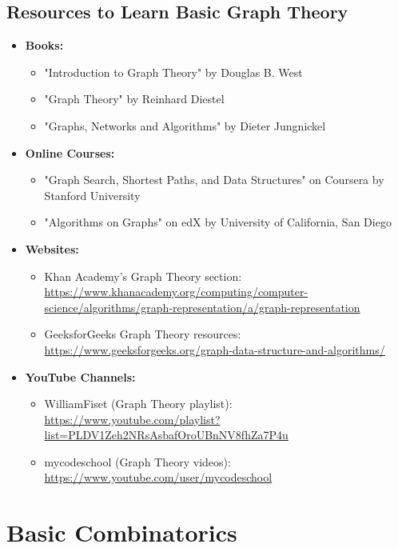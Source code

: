 \documentclass[openany]{book}
\begin{document}
\subsection{Resources to Learn Basic Graph Theory}
\begin{itemize}
    \item \textbf{Books:}
    \begin{itemize}
        \item "Introduction to Graph Theory" by Douglas B. West
        \item "Graph Theory" by Reinhard Diestel
        \item "Graphs, Networks and Algorithms" by Dieter Jungnickel
    \end{itemize}
    \item \textbf{Online Courses:}
    \begin{itemize}
        \item "Graph Search, Shortest Paths, and Data Structures" on Coursera by Stanford University
        \item "Algorithms on Graphs" on edX by University of California, San Diego
    \end{itemize}
    \item \textbf{Websites:}
    \begin{itemize}
        \item Khan Academy's Graph Theory section: \url{https://www.khanacademy.org/computing/computer-science/algorithms/graph-representation/a/graph-representation}
        \item GeeksforGeeks Graph Theory resources: \url{https://www.geeksforgeeks.org/graph-data-structure-and-algorithms/}
    \end{itemize}
    \item \textbf{YouTube Channels:}
    \begin{itemize}
        \item WilliamFiset (Graph Theory playlist): \url{https://www.youtube.com/playlist?list=PLDV1Zeh2NRsAsbafOroUBnNV8fhZa7P4u}
        \item mycodeschool (Graph Theory videos): \url{https://www.youtube.com/user/mycodeschool}
    \end{itemize}
\end{itemize}
\section{Basic Combinatorics}
\end{document}
